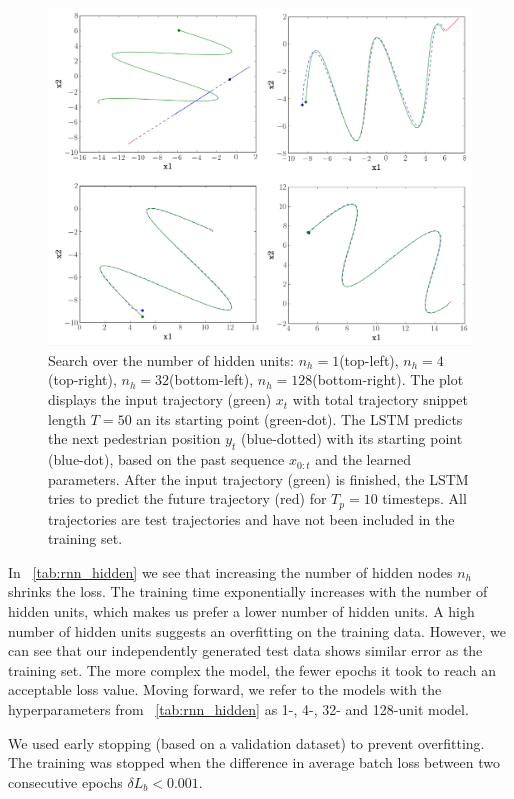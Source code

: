 \begin{figure}
	\centering
	\includegraphics [trim=0 0 0 0, clip, angle=0, width=1.0\columnwidth,
	keepaspectratio]{figures/rnn_hidden}
	\caption{Search over the number of hidden units: $n_h=1$(top-left), $n_h=4$(top-right), $n_h=32$(bottom-left), $n_h=128$(bottom-right). The plot displays the input trajectory (green) $x_t$ with total trajectory snippet length $T=50$ an its starting point (green-dot). The LSTM predicts the next pedestrian position $y_t$ (blue-dotted) with its starting point (blue-dot), based on the past sequence $x_{0:t}$ and the learned parameters. After the input trajectory (green) is finished, the LSTM tries to predict the future trajectory (red) for $T_p=10$ timesteps. All trajectories are test trajectories and have not been included in the training set.}
	\label{fig:rnn_hidden}
\end{figure}

In ~\cref{tab:rnn_hidden} we see that increasing the number of hidden nodes $n_h$ shrinks the loss.
The training time exponentially increases with the number of hidden units, which makes us prefer a lower number of hidden units.
A high number of hidden units suggests an overfitting on the training data.
However, we can see that our independently generated test data shows similar error as the training set.
The more complex the model, the fewer epochs it took to reach an acceptable loss value.
Moving forward, we refer to the models with the hyperparameters from ~\cref{tab:rnn_hidden} as 1-, 4-, 32- and 128-unit model.

We used early stopping (based on a validation dataset) to prevent overfitting.
The training was stopped when the difference in average batch loss between two consecutive epochs $\delta L_b < 0.001$.


